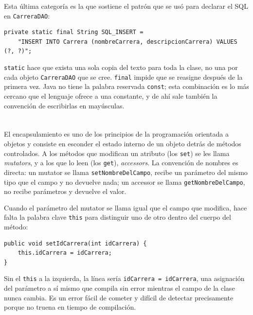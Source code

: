 \documentclass[10pt,a4paper]{article}
\begin{document}
Esta última categoría es la que sostiene el patrón que se usó para declarar el SQL en \texttt{CarreraDAO}:

\begin{lstlisting}[caption={Campo estático, final y privado usado como constante}]
private static final String SQL_INSERT =
    "INSERT INTO Carrera (nombreCarrera, descripcionCarrera) VALUES (?, ?)";
\end{lstlisting}

\texttt{static} hace que exista una sola copia del texto para toda la clase, no una por cada objeto \texttt{CarreraDAO} que se cree. \texttt{final} impide que se reasigne después de la primera vez. Java no tiene la palabra reservada \texttt{const}; esta combinación es lo más cercano que el lenguaje ofrece a una constante, y de ahí sale también la convención de escribirlas en mayúsculas.

\section{\color{colorIPN}{Encapsulamiento: mutators y accessors}}

El encapsulamiento es uno de los principios de la programación orientada a objetos y consiste en esconder el estado interno de un objeto detrás de métodos controlados. A los métodos que modifican un atributo (los \texttt{set}) se les llama \textit{mutators}, y a los que lo leen (los \texttt{get}), \textit{accessors}. La convención de nombres es directa: un mutator se llama \texttt{setNombreDelCampo}, recibe un parámetro del mismo tipo que el campo y no devuelve nada; un accessor se llama \texttt{getNombreDelCampo}, no recibe parámetros y devuelve el valor.

Cuando el parámetro del mutator se llama igual que el campo que modifica, hace falta la palabra clave \texttt{this} para distinguir uno de otro dentro del cuerpo del método:

\begin{lstlisting}[caption={Uso de \texttt{this} cuando el parámetro repite el nombre del campo}]
public void setIdCarrera(int idCarrera) {
    this.idCarrera = idCarrera;
}
\end{lstlisting}

Sin el \texttt{this} a la izquierda, la línea sería \texttt{idCarrera = idCarrera}, una asignación del parámetro a sí mismo que compila sin error mientras el campo de la clase nunca cambia. Es un error fácil de cometer y difícil de detectar precisamente porque no truena en tiempo de compilación.
\end{document}
